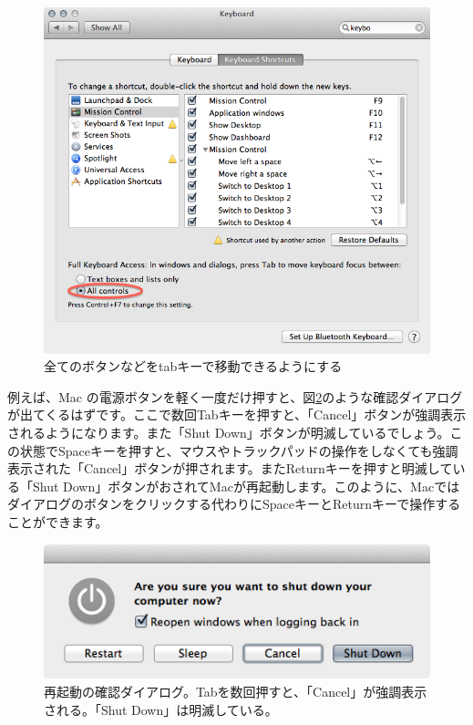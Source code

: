 \begin{figure}
  \begin{center}
    \includegraphics[scale=0.4,bb= 0 0 668 636]{fig/Keyboard2.png}
    \caption{全てのボタンなどをtabキーで移動できるようにする}
    \label{fig_Keyboard2_png}
  \end{center}
\end{figure}

例えば、Mac の電源ボタンを軽く一度だけ押すと、図\ref{fig_reboot_png}のような確認ダイアログが出てくるはずです。ここで数回Tabキーを押すと、「Cancel」ボタンが強調表示されるようになります。また「Shut Down」ボタンが明滅しているでしょう。この状態でSpaceキーを押すと、マウスやトラックパッドの操作をしなくても強調表示された「Cancel」ボタンが押されます。またReturnキーを押すと明滅している「Shut Down」ボタンがおされてMacが再起動します。このように、Macではダイアログのボタンをクリックする代わりにSpaceキーとReturnキーで操作することができます。

\begin{figure}
  \begin{center}
    \includegraphics[scale=0.4,bb= 0 0 453 158]{fig/reboot.png}
    \caption{再起動の確認ダイアログ。Tabを数回押すと、「Cancel」が強調表示される。「Shut Down」は明滅している。}
    \label{fig_reboot_png}
  \end{center}
\end{figure}

